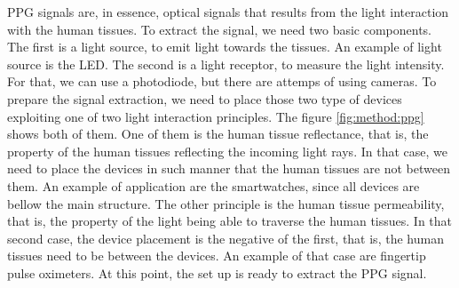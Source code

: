 \gls{PPG} signals are, in essence, optical signals that results from the light interaction with the human tissues. To extract the signal, we need two basic components. The first is a light source, to emit light towards the tissues. An example of light source is the \gls{LED}. The second is a light receptor, to measure the light intensity. For that, we can use a photodiode, but there are attemps of using cameras. To prepare the signal extraction, we need to place those two type of devices exploiting one of two light interaction principles. The figure \ref{fig:method:ppg} shows both of them. One of them is the human tissue reflectance, that is, the property of the human tissues reflecting the incoming light rays. In that case, we need to place the devices in such manner that the human tissues are not between them. An example of application are the smartwatches, since all devices are bellow the main structure.  The other principle is the human tissue permeability, that is, the property of the light being able to traverse the human tissues. In that second case, the device placement is the negative of the first, that is, the human tissues need to be between the devices. An example of that case are fingertip pulse oximeters. At this point, the set up is ready to extract the \gls{PPG} signal.


